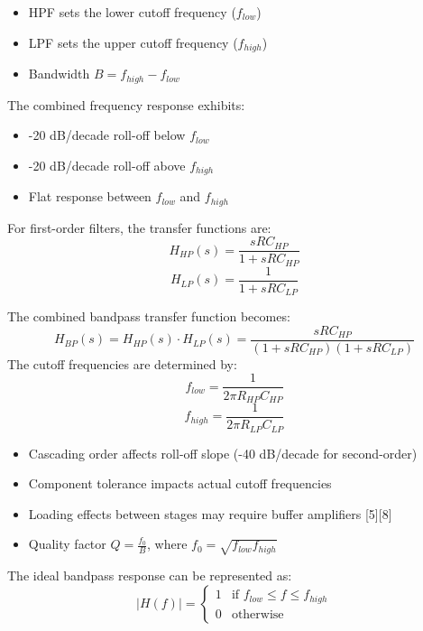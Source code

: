 \documentclass[12pt]{article}
\begin{document}
\begin{itemize}
    \item HPF sets the lower cutoff frequency ($f_{low}$)
    \item LPF sets the upper cutoff frequency ($f_{high}$)
    \item Bandwidth $B = f_{high} - f_{low}$
\end{itemize}
The combined frequency response exhibits:
\begin{itemize}
    \item -20 dB/decade roll-off below $f_{low}$
    \item -20 dB/decade roll-off above $f_{high}$
    \item Flat response between $f_{low}$ and $f_{high}$
\end{itemize}

For first-order filters, the transfer functions are:
\begin{equation}
    H_{HP}(s) = \frac{sRC_{HP}}{1 + sRC_{HP}}
\end{equation}
\begin{equation}
    H_{LP}(s) = \frac{1}{1 + sRC_{LP}}
\end{equation}

The combined bandpass transfer function becomes:
\begin{equation}
    H_{BP}(s) = H_{HP}(s) \cdot H_{LP}(s) = \frac{sRC_{HP}}{(1 + sRC_{HP})(1 + sRC_{LP})}
\end{equation}
The cutoff frequencies are determined by:
\begin{equation}
    f_{low} = \frac{1}{2\pi R_{HP}C_{HP}}
\end{equation}
\begin{equation}
    f_{high} = \frac{1}{2\pi R_{LP}C_{LP}}
\end{equation}
\begin{itemize}
    \item Cascading order affects roll-off slope (-40 dB/decade for second-order)
    \item Component tolerance impacts actual cutoff frequencies
    \item Loading effects between stages may require buffer amplifiers [5][8]
    \item Quality factor $Q = \frac{f_0}{B}$, where $f_0 = \sqrt{f_{low}f_{high}}$
\end{itemize}
The ideal bandpass response can be represented as:
\begin{equation}
    |H(f)| = \begin{cases}
        1 & \text{if } f_{low} \leq f \leq f_{high} \\
        0 & \text{otherwise}
    \end{cases}
\end{equation}
\end{document}
